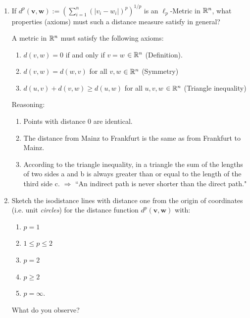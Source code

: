 \begin{enumerate}
		\item If $d^{p}(\mathbf{v,w}):=\left( \sum_{i=1}^{n} \left( \left| v_i - w_i \right| \right)^{p} \right)^{1/p}$ is an $\ell_p$-Metric in $\mathbb{R}^{n}$, what properties (axioms) must such a distance measure satisfy in general?
	\begin{solution}
	A metric in $\mathbb{R}^n$ must satisfy the following axioms:	
		\begin{enumerate}
			\item $d\left(v,w\right) = 0$ if and only if $v = w$ $\in \mathbb{R}^n$ (Definition).
			\item $d\left(v,w\right) = d\left(w,v\right)$ for all $v,w$ $\in \mathbb{R}^n$ (Symmetry)
			\item $d\left(u,v\right) + d\left(v,w\right) \geq d\left(u,w\right)$ for all $u,v,w$ $\in \mathbb{R}^n$ (Triangle inequality)
		\end{enumerate}
	Reasoning:
		\begin{enumerate}
			\item Points with distance $0$ are identical.
			\item The distance from Mainz to Frankfurt is the same as from Frankfurt to Mainz.
			\item According to the triangle inequality, in a triangle the sum of the lengths of two sides a and b is always greater than or equal to the length of the third side c. $\Rightarrow$ ``An indirect path is never shorter than the direct path."
		\end{enumerate}
	\end{solution}
	
		\item Sketch the isodistance lines with distance one from the origin of coordinates (i.e. unit \emph{circles}) for the distance function $d^{p}(\mathbf{v,w})$ with:
	\begin{enumerate}
	\item $p = 1$
	\item $1 \leq p \leq 2$
 	\item $p = 2$
 	\item $p \geq 2$
 	\item $p = \infty$.
\end{enumerate}
 What do you observe?
 \begin{solution}


\end{solution}
\end{enumerate}
